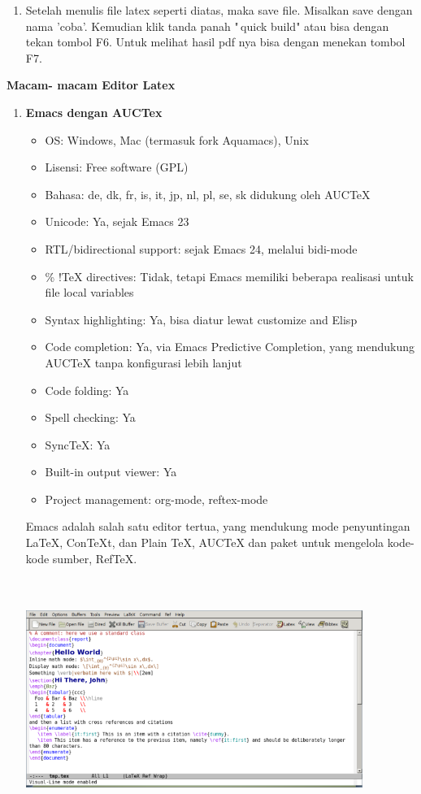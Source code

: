 \begin{enumerate}
\setcounter{enumi}{\thenumberedCntC}
\item Setelah menulis file latex seperti diatas, maka save file. Misalkan save dengan nama 'coba'. Kemudian klik tanda panah "\,quick build" atau bisa dengan tekan tombol F6. Untuk melihat hasil pdf nya bisa dengan menekan tombol F7.
\setcounter{numberedCntC}{\theenumi}
\end{enumerate}

\textbf{Macam- macam Editor Latex}

\begin{enumerate}
\item \textbf{Emacs dengan AUCTex}
\begin{itemize}
\item OS: Windows, Mac (termasuk fork Aquamacs), Unix
\item Lisensi: Free software (GPL)
\item Bahasa: de, dk, fr, is, it, jp, nl, pl, se, sk didukung oleh AUCTeX
\item Unicode: Ya, sejak Emacs 23
\item RTL/bidirectional support: sejak Emacs 24, melalui bidi-mode
\item \% !TeX directives: Tidak, tetapi Emacs memiliki beberapa realisasi untuk file local variables
\item Syntax highlighting: Ya, bisa diatur lewat customize and Elisp
\item Code completion: Ya, via Emacs Predictive Completion, yang mendukung AUCTeX tanpa konfigurasi lebih lanjut
\item Code folding: Ya
\item Spell checking: Ya
\item SyncTeX: Ya
\item Built-in output viewer: Ya
\item Project management: org-mode, reftex-mode
\end{itemize}
\hspace{0,5in}Emacs adalah salah satu editor tertua, yang mendukung mode penyuntingan LaTeX, ConTeXt, dan Plain TeX, AUCTeX dan paket untuk mengelola kode-kode sumber, RefTeX.

\includegraphics[width=10.95cm,height=7.87cm]{gambar/image2.jpg}
\par \vspace{12pt}


\end{enumerate}
